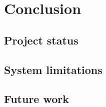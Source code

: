 \chapter{Conclusion}
\label{chapter:conclusions}

\section{Project status}

\section{System limitations}

\section{Future work}
